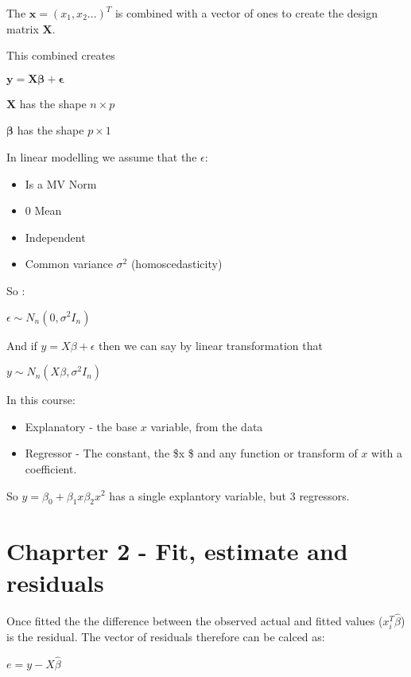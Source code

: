 \documentclass[
  letterpaper,
  DIV=11,
  numbers=noendperiod]{scrreprt}
\providecommand{\tightlist}{%
  \setlength{\itemsep}{0pt}\setlength{\parskip}{0pt}}\usepackage{longtable,booktabs,array}
\begin{document}
The \(\boldsymbol{x} = (x_1, x_2...)^T\) is combined with a vector of
ones to create the design matrix \(\boldsymbol{X}\).

This combined creates

\(\boldsymbol{y} = \boldsymbol{X} \boldsymbol{\beta}+ \boldsymbol{\epsilon}\)

\(\boldsymbol{X}\) has the shape \(n \times p\)

\(\boldsymbol{\beta}\) has the shape \(p \times 1\)

In linear modelling we assume that the \(\epsilon\):

\begin{itemize}
\tightlist
\item
  Is a MV Norm
\item
  0 Mean
\item
  Independent
\item
  Common variance \(\sigma^2\) (homoscedasticity)
\end{itemize}

So :

\(\epsilon \sim N_n(0, \sigma^2 I_n)\)

And if \(y = X\beta + \epsilon\) then we can say by linear
transformation that

\(y \sim N_n(X\beta, \sigma^2 I_n)\)

In this course:

\begin{itemize}
\tightlist
\item
  Explanatory - the base \(x\) variable, from the data
\item
  Regressor - The constant, the \$\beta x \$ and any function or
  transform of \(x\) with a coefficient.
\end{itemize}

So \(y = \beta_0 + \beta_1 x \beta_2 x^2\) has a single explantory
variable, but 3 regressors.

\hypertarget{chaprter-2---fit-estimate-and-residuals}{%
\section{Chaprter 2 - Fit, estimate and
residuals}\label{chaprter-2---fit-estimate-and-residuals}}

Once fitted the the difference between the observed actual and fitted
values (\(x_i^T\hat{\beta}\)) is the residual. The vector of residuals
therefore can be calced as:

\(e = y - X\hat{\beta}\)
\end{document}
